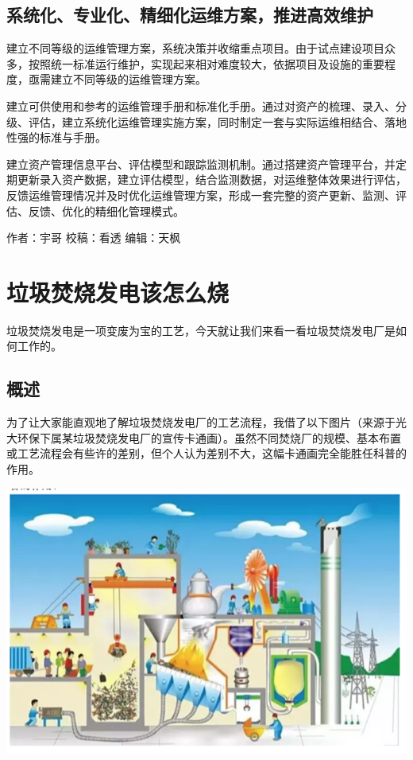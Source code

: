 \documentclass[
]{book}
\begin{document}
\hypertarget{ux7cfbux7edfux5316ux4e13ux4e1aux5316ux7cbeux7ec6ux5316ux8fd0ux7ef4ux65b9ux6848ux63a8ux8fdbux9ad8ux6548ux7ef4ux62a4}{%
\subsection{系统化、专业化、精细化运维方案，推进高效维护}\label{ux7cfbux7edfux5316ux4e13ux4e1aux5316ux7cbeux7ec6ux5316ux8fd0ux7ef4ux65b9ux6848ux63a8ux8fdbux9ad8ux6548ux7ef4ux62a4}}

建立不同等级的运维管理方案，系统决策并收缩重点项目。由于试点建设项目众多，按照统一标准运行维护，实现起来相对难度较大，依据项目及设施的重要程度，亟需建立不同等级的运维管理方案。

建立可供使用和参考的运维管理手册和标准化手册。通过对资产的梳理、录入、分级、评估，建立系统化运维管理实施方案，同时制定一套与实际运维相结合、落地性强的标准与手册。

建立资产管理信息平台、评估模型和跟踪监测机制。通过搭建资产管理平台，并定期更新录入资产数据，建立评估模型，结合监测数据，对运维整体效果进行评估，反馈运维管理情况并及时优化运维管理方案，形成一套完整的资产更新、监测、评估、反馈、优化的精细化管理模式。

作者：宇哥
校稿：看透
编辑：天枫

\hypertarget{ux5783ux573eux711aux70e7ux53d1ux7535ux8be5ux600eux4e48ux70e7}{%
\section{垃圾焚烧发电该怎么烧}\label{ux5783ux573eux711aux70e7ux53d1ux7535ux8be5ux600eux4e48ux70e7}}

垃圾焚烧发电是一项变废为宝的工艺，今天就让我们来看一看垃圾焚烧发电厂是如何工作的。

\hypertarget{ux6982ux8ff0}{%
\subsection{概述}\label{ux6982ux8ff0}}

为了让大家能直观地了解垃圾焚烧发电厂的工艺流程，我借了以下图片（来源于光大环保下属某垃圾焚烧发电厂的宣传卡通画）。虽然不同焚烧厂的规模、基本布置或工艺流程会有些许的差别，但个人认为差别不大，这幅卡通画完全能胜任科普的作用。

\includegraphics[width=8.33in]{images/ljfs1}
\end{document}
